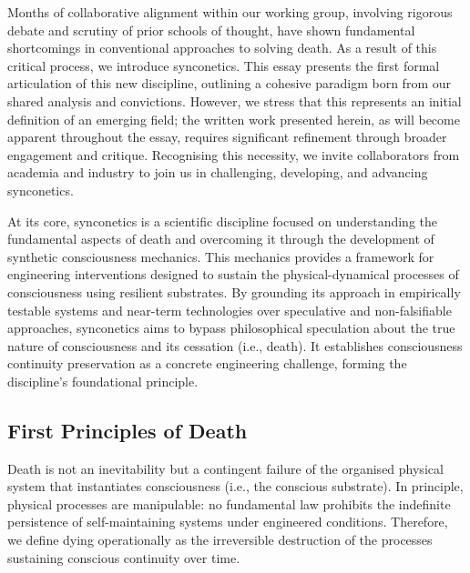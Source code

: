 \documentclass[10pt]{article}
\begin{document}
\begin{sloppypar}
  Months of collaborative alignment within our working group, involving rigorous debate and scrutiny of prior schools of thought, have shown fundamental shortcomings in conventional approaches to solving death. As a result of this critical process, we introduce synconetics. This essay presents the first formal articulation of this new discipline, outlining a cohesive paradigm born from our shared analysis and convictions. However, we stress that this represents an initial definition of an emerging field; the written work presented herein, as will become apparent throughout the essay, requires significant refinement through broader engagement and critique. Recognising this necessity, we invite collaborators from academia and industry to join us in challenging, developing, and advancing synconetics.

  At its core, synconetics is a scientific discipline focused on understanding the fundamental aspects of death and overcoming it through the development of synthetic consciousness mechanics. This mechanics provides a framework for engineering interventions designed to sustain the physical-dynamical processes of consciousness using resilient substrates. By grounding its approach in empirically testable systems and near-term technologies over speculative and non-falsifiable approaches, synconetics aims to bypass philosophical speculation about the true nature of consciousness and its cessation (i.e., death). It establishes consciousness continuity preservation as a concrete engineering challenge, forming the discipline’s foundational principle.

  \subsection{First Principles of Death}
  \label{sec:first-principles}

  Death is not an inevitability but a contingent failure of the organised physical system that instantiates consciousness (i.e., the conscious substrate). In principle, physical processes are manipulable: no fundamental law prohibits the indefinite persistence of self-maintaining systems under engineered conditions. Therefore, we define dying operationally as the irreversible destruction of the processes sustaining conscious continuity over time.


\end{sloppypar}
\end{document}
